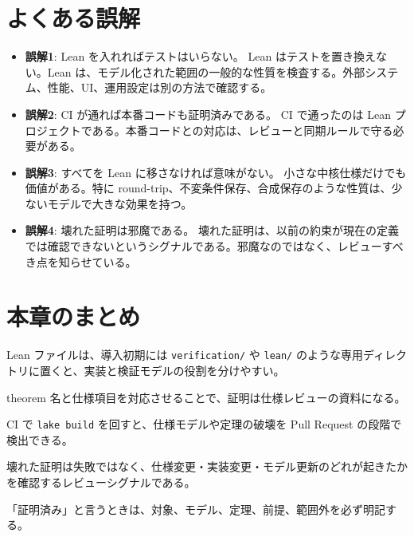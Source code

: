 \section{よくある誤解}

\begin{warningbox}
\begin{itemize}
\item \textbf{誤解1}: Lean を入れればテストはいらない。\newline
Lean はテストを置き換えない。Lean は、モデル化された範囲の一般的な性質を検査する。外部システム、性能、UI、運用設定は別の方法で確認する。
\item \textbf{誤解2}: CI が通れば本番コードも証明済みである。\newline
CI で通ったのは Lean プロジェクトである。本番コードとの対応は、レビューと同期ルールで守る必要がある。
\item \textbf{誤解3}: すべてを Lean に移さなければ意味がない。\newline
小さな中核仕様だけでも価値がある。特に round-trip、不変条件保存、合成保存のような性質は、少ないモデルで大きな効果を持つ。
\item \textbf{誤解4}: 壊れた証明は邪魔である。\newline
壊れた証明は、以前の約束が現在の定義では確認できないというシグナルである。邪魔なのではなく、レビューすべき点を知らせている。
\end{itemize}
\end{warningbox}

\section{本章のまとめ}

Lean ファイルは、導入初期には \texttt{verification/} や \texttt{lean/} のような専用ディレクトリに置くと、実装と検証モデルの役割を分けやすい。

theorem 名と仕様項目を対応させることで、証明は仕様レビューの資料になる。

CI で \texttt{lake build} を回すと、仕様モデルや定理の破壊を Pull Request の段階で検出できる。

壊れた証明は失敗ではなく、仕様変更・実装変更・モデル更新のどれが起きたかを確認するレビューシグナルである。

「証明済み」と言うときは、対象、モデル、定理、前提、範囲外を必ず明記する。

